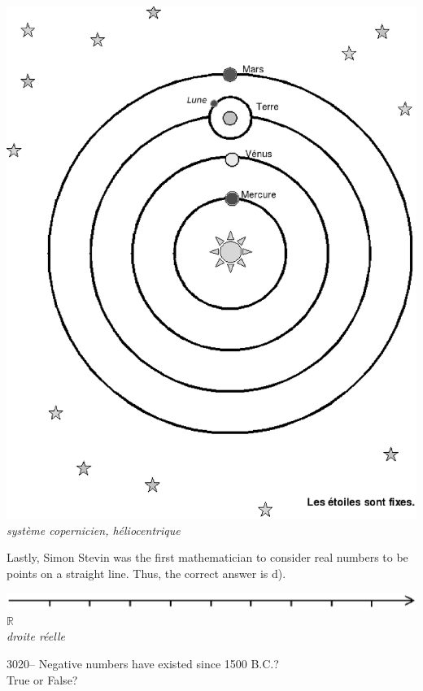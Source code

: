 \documentclass[letterpaper, 12pt]{article}
\begin{document}
\begin{center}
\includegraphics[scale=0.25]{heliocentrique.eps}\\
\emph{{\small syst\`eme copernicien, h\'eliocentrique}}
\end{center}

Lastly, Simon Stevin was the first mathematician to consider real numbers to be points on a straight line. Thus, the correct answer is d).\\
\begin{center}
\includegraphics[scale=0.25]{droitereelle.eps} {\large$\mathbb{R}$}\\
\emph{{\small droite r\'eelle}}
\end{center}



3020-- Negative numbers have existed since 1500 B.C.?\\
True or False?\\
\end{document}
